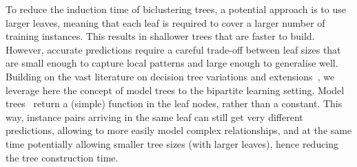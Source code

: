 \documentclass[sn-mathphys-num]{sn-jnl}%
\theoremstyle{thmstyleone}%
\theoremstyle{thmstyletwo}%
\theoremstyle{thmstylethree}%
\begin{document}
To reduce the induction time of biclustering trees, a potential approach is to use larger leaves, meaning that each leaf is required to cover a larger number of training instances. This results in shallower trees that are faster to build.
However, accurate predictions require a careful trade-off between leaf sizes that are small enough to capture local patterns and large enough to generalise well. Building on the vast literature on decision tree variations and extensions~\cite{costa_recent_2023}, we leverage here the concept of model trees to the bipartite learning setting.
Model trees~\cite{quinlan1992learning,landwehr_logistic_2005,costa_recent_2023} return a (simple) function in the leaf nodes, rather than a constant. This way, instance pairs arriving in the same leaf can still get very different predictions, allowing to more easily model complex relationships, and at the same time potentially allowing smaller tree sizes (with larger leaves), hence reducing the tree construction time.


\end{document}
